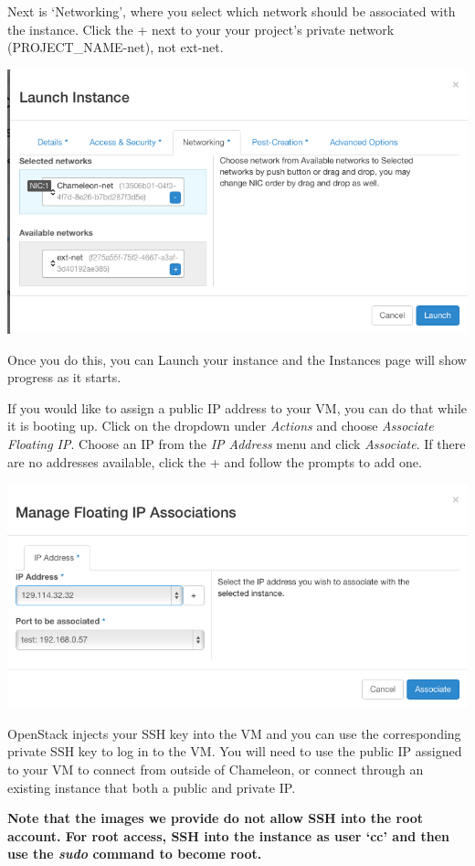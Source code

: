 Next is `Networking', where you select which network should be
associated with the instance. Click the + next to your your project's
private network (PROJECT\_NAME-net), not ext-net.

\includegraphics[width=0.8\columnwidth]{images/chameleon/openstack_alamo_networking.png}

Once you do this, you can Launch your instance and the Instances page
will show progress as it starts.

If you would like to assign a public IP address to your VM, you can do
that while it is booting up. Click on the dropdown under \emph{Actions}
and choose \emph{Associate Floating IP}. Choose an IP from the \emph{IP
Address} menu and click \emph{Associate}. If there are no addresses
available, click the + and follow the prompts to add one.

\includegraphics[width=0.8\columnwidth]{images/chameleon/openstack_alamo_floating.png}

OpenStack injects your SSH key into the VM and you can use the
corresponding private SSH key to log in to the VM. You will need to use
the public IP assigned to your VM to connect from outside of Chameleon,
or connect through an existing instance that both a public and private
IP.

\textbf{Note that the images we provide do not allow SSH into the root
account. For root access, SSH into the instance as user `cc' and then
use the \emph{sudo} command to become root.}

